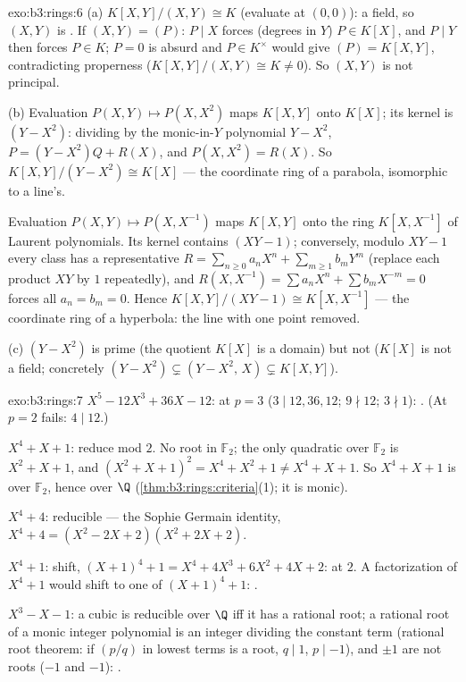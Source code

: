 \begin{solution}{exo:b3:rings:6}
(a) $K[X,Y]/(X,Y) \cong K$ (evaluate at $(0,0)$): a field, so
$(X,Y)$ is . If $(X, Y) = (P)$: $P \mid X$ forces (degrees
in $Y$) $P \in K[X]$, and $P \mid Y$ then forces $P \in K$; $P =
0$ is absurd and $P \in K^\times$ would give $(P) = K[X,Y]$,
contradicting properness ($K[X,Y]/(X,Y) \cong K \neq 0$). So
$(X,Y)$ is not principal.

(b) Evaluation $P(X, Y) \mapsto P(X, X^2)$ maps $K[X,Y]$ onto
$K[X]$; its kernel is $(Y - X^2)$: dividing by the monic-in-$Y$
polynomial $Y - X^2$, $P = (Y - X^2)Q + R(X)$, and $P(X, X^2) =
R(X)$. So $K[X,Y]/(Y - X^2) \cong K[X]$ --- the coordinate ring of
a parabola, isomorphic to a line's.

Evaluation $P(X, Y) \mapsto P(X, X^{-1})$ maps $K[X, Y]$ onto the
ring $K[X, X^{-1}]$ of Laurent polynomials. Its kernel contains
$(XY - 1)$; conversely, modulo $XY - 1$ every class has a
representative $R = \sum_{n \geq 0} a_nX^n + \sum_{m \geq 1} b_m
Y^m$ (replace each product $XY$ by $1$ repeatedly), and $R(X,
X^{-1}) = \sum a_n X^n + \sum b_m X^{-m} = 0$ forces all $a_n =
b_m = 0$. Hence $K[X, Y]/(XY - 1) \cong K[X, X^{-1}]$ --- the
coordinate ring of a hyperbola: the line with one point removed.

(c) $(Y - X^2)$ is prime (the quotient $K[X]$ is a domain) but not
 ($K[X]$ is not a field; concretely $(Y - X^2) \subsetneq
(Y - X^2,\, X) \subsetneq K[X,Y]$).
\end{solution}

\begin{solution}{exo:b3:rings:7}
\emph{$X^5 - 12X^3 + 36X - 12$}:  at $p = 3$ ($3 \mid
12, 36, 12$; $9 \nmid 12$; $3 \nmid 1$): . (At $p = 2$
 fails: $4 \mid 12$.)

\emph{$X^4 + X + 1$}: reduce mod $2$. No root in $\mathbb F_2$;
the only  quadratic over $\mathbb F_2$ is $X^2 + X +
1$, and $(X^2+X+1)^2 = X^4 + X^2 + 1 \neq X^4 + X + 1$. So $X^4 +
X + 1$ is  over $\mathbb F_2$, hence over $\Q$
(\cref{thm:b3:rings:criteria}(1); it is monic).

\emph{$X^4 + 4$}: reducible --- the Sophie Germain identity,
$X^4 + 4 = (X^2 - 2X + 2)(X^2 + 2X + 2)$.

\emph{$X^4 + 1$}: shift, $(X+1)^4 + 1 = X^4 + 4X^3 + 6X^2 + 4X +
2$:  at $2$. A factorization of $X^4+1$ would shift to
one of $(X+1)^4 + 1$: .

\emph{$X^3 - X - 1$}: a cubic is reducible over $\Q$ iff it has a
rational root; a rational root of a monic integer polynomial is an
integer dividing the constant term (rational root theorem: if
$(p/q)$ in lowest terms is a root, $q \mid 1$, $p \mid -1$), and
$\pm 1$ are not roots ($-1$ and $-1$): .
\end{solution}

